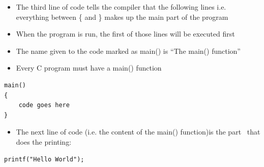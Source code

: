 \documentclass{beamer}
\begin{document}
\begin{frame}[fragile]

\begin{itemize}
\item The third line of code tells the compiler that the following lines i.e. everything between \{ and \} makes up the main part of the program
\item When the program is run, the first of those lines will be executed first
\item The name given to the code marked as main() is ``The main() function''
\item Every C program must have a main() function
\end{itemize}

\begin{block}{}
\begin{lstlisting}
main()
{
	code goes here
}\end{lstlisting}
\end{block}


\end{frame} 

\begin{frame}[fragile]

\begin{itemize}
\item The next line of code (i.e. the content of the main() function)is the part \ that does the printing:
\end{itemize}

\begin{block}{}
\begin{lstlisting}
printf("Hello World");
\end{lstlisting}
\end{block}
\end{frame} 
\end{document}

